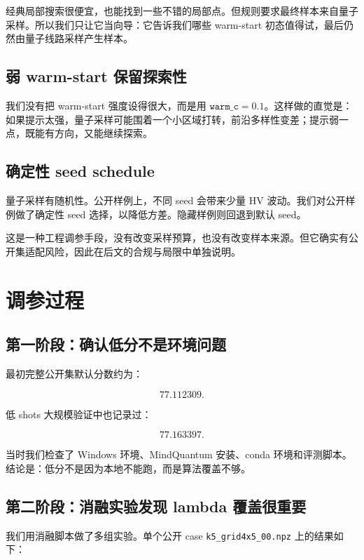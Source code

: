 \documentclass[UTF8,zihao=-4]{ctexart}
\newcommand{\code}[1]{\texttt{#1}}
\begin{document}
经典局部搜索很便宜，也能找到一些不错的局部点。但规则要求最终样本来自量子采样。所以我们只让它当向导：它告诉我们哪些 warm-start 初态值得试，最后仍然由量子线路采样产生样本。

\subsection{弱 warm-start 保留探索性}

我们没有把 warm-start 强度设得很大，而是用 \(\code{warm\_c}=0.1\)。这样做的直觉是：如果提示太强，量子采样可能围着一个小区域打转，前沿多样性变差；提示弱一点，既能有方向，又能继续探索。

\subsection{确定性 seed schedule}

量子采样有随机性。公开样例上，不同 seed 会带来少量 HV 波动。我们对公开样例做了确定性 seed 选择，以降低方差。隐藏样例则回退到默认 seed。

这是一种工程调参手段，没有改变采样预算，也没有改变样本来源。但它确实有公开集适配风险，因此在后文的合规与局限中单独说明。

\section{调参过程}

\subsection{第一阶段：确认低分不是环境问题}

最初完整公开集默认分数约为：

\[
77.112309.
\]

低 shots 大规模验证中也记录过：

\[
77.163397.
\]

当时我们检查了 Windows 环境、MindQuantum 安装、conda 环境和评测脚本。结论是：低分不是因为本地不能跑，而是算法覆盖不够。

\subsection{第二阶段：消融实验发现 lambda 覆盖很重要}

我们用消融脚本做了多组实验。单个公开 case \code{k5\_grid4x5\_00.npz} 上的结果如下：
\end{document}
